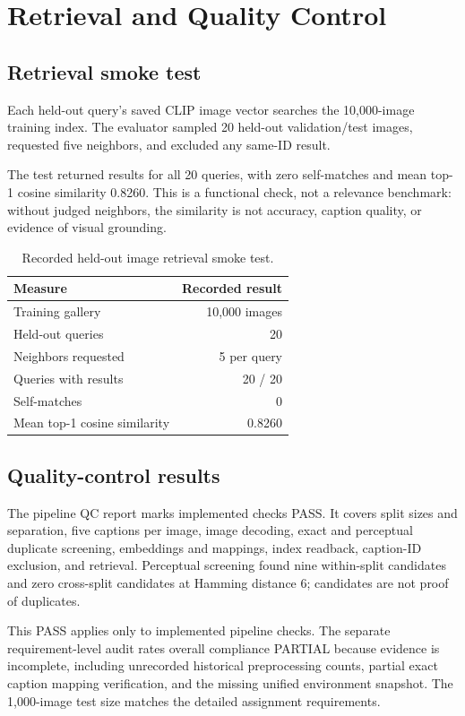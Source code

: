 \section{Retrieval and Quality Control}
\label{ch:retrieval}

\subsection{Retrieval smoke test}
Each held-out query's saved CLIP image vector searches the 10,000-image training index. The evaluator sampled 20 held-out validation/test images, requested five neighbors, and excluded any same-ID result.

The test returned results for all 20 queries, with zero self-matches and mean top-1 cosine similarity 0.8260. This is a functional check, not a relevance benchmark: without judged neighbors, the similarity is not accuracy, caption quality, or evidence of visual grounding.

\begin{table}[htbp]
\centering
\caption{Recorded held-out image retrieval smoke test.}
\label{tab:retrieval-results}
\begin{tabularx}{0.85\textwidth}{@{}Xr@{}}
\toprule
Measure & Recorded result\\
\midrule
Training gallery & 10,000 images\\
Held-out queries & 20\\
Neighbors requested & 5 per query\\
Queries with results & 20 / 20\\
Self-matches & 0\\
Mean top-1 cosine similarity & 0.8260\\
\bottomrule
\end{tabularx}
\end{table}

\subsection{Quality-control results}
The pipeline QC report marks implemented checks PASS. It covers split sizes and separation, five captions per image, image decoding, exact and perceptual duplicate screening, embeddings and mappings, index readback, caption-ID exclusion, and retrieval. Perceptual screening found nine within-split candidates and zero cross-split candidates at Hamming distance 6; candidates are not proof of duplicates.



This PASS applies only to implemented pipeline checks. The separate requirement-level audit rates overall compliance PARTIAL because evidence is incomplete, including unrecorded historical preprocessing counts, partial exact caption mapping verification, and the missing unified environment snapshot. The 1,000-image test size matches the detailed assignment requirements.
